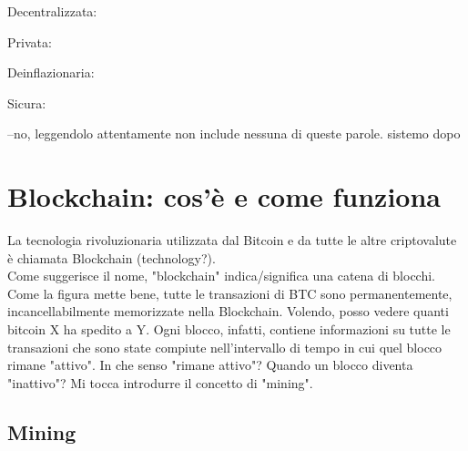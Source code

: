 \documentclass {article}
\begin{document}
Decentralizzata:

Privata:

Deinflazionaria:

Sicura:

--no, leggendolo attentamente non include nessuna di queste parole. sistemo dopo


\section {Blockchain: cos'è e come funziona}


La tecnologia rivoluzionaria utilizzata dal Bitcoin e da tutte le altre criptovalute è chiamata Blockchain (technology?).\\
Come suggerisce il nome, "blockchain" indica/significa una catena di blocchi.
Come la figura mette bene, tutte le transazioni di BTC sono permanentemente, incancellabilmente memorizzate nella Blockchain.
Volendo, posso vedere quanti bitcoin X ha spedito a Y. Ogni blocco, infatti, contiene informazioni su tutte le transazioni che sono state compiute nell'intervallo di tempo in cui quel blocco rimane "attivo".
In che senso "rimane attivo"? Quando un blocco diventa "inattivo"?
Mi tocca introdurre il concetto di "mining".


\subsection {Mining}
\end{document}
